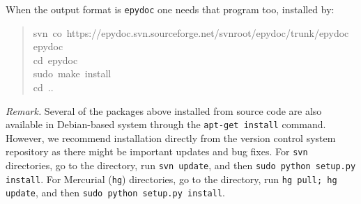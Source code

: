 \documentclass[a4paper]{article}
\begin{document}
When the output format is \texttt{epydoc} one needs that program too, installed
by:
%
\begin{quote}{\ttfamily \raggedright \noindent
svn~co~https://epydoc.svn.sourceforge.net/svnroot/epydoc/trunk/epydoc~epydoc\\
cd~epydoc\\
sudo~make~install\\
cd~..
}
\end{quote}

\emph{Remark.} Several of the packages above installed from source code
are also available in Debian-based system through the
\texttt{apt-get install} command. However, we recommend installation directly
from the version control system repository as there might be important
updates and bug fixes. For \texttt{svn} directories, go to the directory,
run \texttt{svn update}, and then \texttt{sudo python setup.py install}. For
Mercurial (\texttt{hg}) directories, go to the directory, run
\texttt{hg pull; hg update}, and then \texttt{sudo python setup.py install}.
\end{document}
